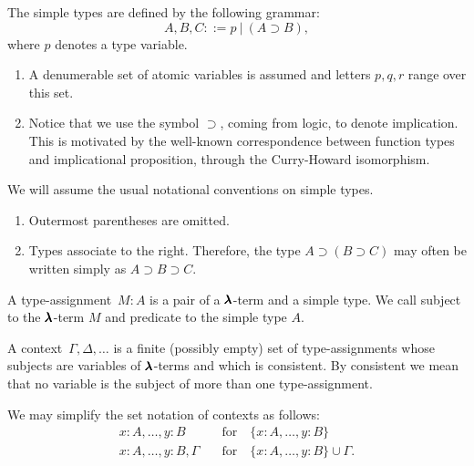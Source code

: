 \begin{definition}
  The simple types are defined by the following grammar:  
  \[
    A, B, C ::= p \ | \ (A \supset B),
  \]
  where $p$ denotes a type variable.
\end{definition}

\begin{remark} \hfill
  \begin{enumerate}
  \item A denumerable set of atomic variables is assumed and letters $p, q, r$ range over this set.
  \item Notice that we use the symbol $\supset$, coming from logic, to denote implication.
    This is motivated by the well-known correspondence between function types and implicational proposition, through the Curry-Howard isomorphism.
  \end{enumerate}
\end{remark}

\begin{notation}
  We will assume the usual notational conventions on simple types. 
  \begin{enumerate}
  \item Outermost parentheses are omitted.
  \item Types associate to the right. Therefore, the type $A \supset (B \supset C)$ may often be written simply as $A \supset B \supset C$.
  \end{enumerate}
\end{notation}

\begin{definition}
  A type-assignment~$M : A$ is a pair of a $\pmb{\lambda}$-term and a simple type.
  We call subject to the $\pmb{\lambda}$-term $M$ and predicate to the simple type $A$.
\end{definition}

\begin{definition}[Context]
  A context~$\Gamma, \Delta, \dots$ is a finite (possibly empty) set of type-assignments whose subjects are variables of $\pmb{\lambda}$-terms and which is consistent. By consistent we mean that no variable is the subject of more than one type-assignment.
\end{definition}

\begin{notation} We may simplify the set notation of contexts as follows:
  \begin{align*}
    x:A, \dots, y:B         \quad &\text{for} \quad \{ x:A, \dots, y:B \} \\
    x:A, \dots, y:B, \Gamma \quad &\text{for} \quad \{ x:A, \dots, y:B \} \cup \Gamma.
  \end{align*}
\end{notation}

